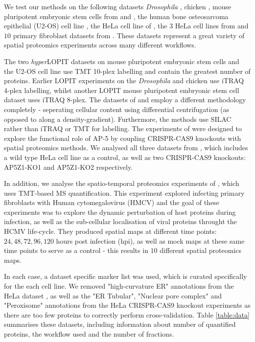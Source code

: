 \documentclass[12pt,english]{article}\usepackage[]{graphicx}\usepackage[]{color}
\begin{document}
We test our methods on the following datasets \textit{Drosophila}
\citep{Tan:2009}, chicken \citep{hall:2009}, mouse pluripotent
embryonic stem cells from \cite{hyper} and \cite{Breckels:2016}, the
human bone osteosarcoma epithelial (U2-OS) cell line
\citep{Thul:2017}, the HeLa cell line of \cite{Itzhak:2016}, the $3$
HeLa cell lines from \cite{Hirst:2018} and $10$ primary fibroblast
datasets from \cite{Jean_Beltran:2016}.  These datasets represent a
great variety of spatial proteomics experiments across many different
workflows.

The two \textit{hyper}LOPIT datasets on mouse pluripotent embryonic
stem cells and the U2-OS cell line use TMT 10-plex labelling and
contain the greatest number of proteins.  Earlier LOPIT experiments on
the \textit{Drosophila} and chicken use iTRAQ 4-plex labelling, whilst
another LOPIT mouse pluripotent embryonic stem cell dataset uses iTRAQ
8-plex. The datasets of \cite{Itzhak:2016} and \cite{Hirst:2018}
employ a different methodology completely - seperating cellular
content using differential centrifugation (as opposed to along a
density-gradient).  Furthermore, the methods use SILAC rather than
iTRAQ or TMT for labelling. The experiments of \cite{Hirst:2018} were
designed to explore the functional role of AP-5 by coupling
CRISPR-CAS9 knockouts with spatial proteomics methods. We analysed all
three datasets from \cite{Hirst:2018}, which includes a wild type HeLa
cell line as a control, as well as two CRISPR-CAS9 knockouts:
AP5Z1-KO1 and AP5Z1-KO2 respectively.

In addition, we analyse the spatio-temporal proteomics experiments of
\cite{Jean_Beltran:2016}, which uses TMT-based MS quantification. This
experiment explored infecting primary fibroblasts with Human
cytomegalovirus (HMCV) and the goal of these experiments was to
explore the dynamic perturbation of host proteins during infection, as
well as the sub-cellular localisation of viral proteins throught the
HCMV life-cycle. They produced spatial maps at different time points:
$24,48,72,96,120$ hours post infection (hpi), as well as mock maps at
these same time points to serve as a control - this results in $10$
different spatial proteomics maps.

In each case, a dataset specific marker list was used, which is
curated specifically for the each cell line. We removed
"high-curvature ER" annotations from the HeLa dataset
\citep{Itzhak:2016}, as well as the "ER Tubular", "Nuclear pore
complex" and "Peroxisome" annotations from the HeLa CRISPR-CAS9
knockout experiments \citep{Hirst:2018} as there are too few proteins
to correctly perform cross-validation. Table \ref{table:data}
summarises these datasets, including information about number of
quantified proteins, the workflow used and the number of fractions.
\end{document}
